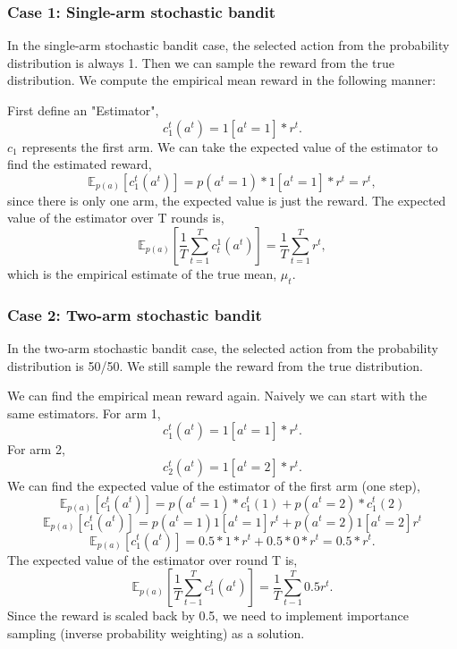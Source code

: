 \documentclass[11pt]{article}
\begin{document}
\subsubsection{Case 1: Single-arm stochastic bandit}
In the single-arm stochastic bandit case, the selected action from the probability distribution is always 1. Then we can sample the reward from the true distribution. We compute the empirical mean reward in the following manner:

First define an "Estimator",
$$ c_1^t(a^t) = 1[a^t = 1] * r^t. $$
$c_1$ represents the first arm. We can take the expected value of the estimator to find the estimated reward,
$$ \mathbb{E}_{p(a)} [c_1^t(a^t)] = p(a^t = 1) * 1[a^t = 1] * r^t = r^t, $$
since there is only one arm, the expected value is just the reward.
The expected value of the estimator over T rounds is,
$$ \mathbb{E}_{p(a)} [ \frac{1}{T} \sum_{t=1}^T c_t^1(a^t)] = \frac{1}{T} \sum_{t=1}^T r^t,$$
which is the empirical estimate of the true mean, $\mu_t$.

\subsubsection{Case 2: Two-arm stochastic bandit}
In the two-arm stochastic bandit case, the selected action from the probability distribution is 50/50. We still sample the reward from the true distribution.

We can find the empirical mean reward again. Naively we can start with the same estimators. For arm 1,
$$ c_1^t(a^t) = 1[a^t = 1] * r^t. $$
For arm 2, $$ c_2^t(a^t) = 1[a^t = 2] * r^t. $$
We can find the expected value of the estimator of the first arm (one step),
$$ \mathbb{E}_{p(a)}[c_1^t(a^t)] = p(a^t = 1) * c^t_1(1) + p(a^t = 2) * c_1^t (2)$$
$$ \mathbb{E}_{p(a)}[c_1^t(a^t)] = p(a^t = 1) 1[a^t = 1]r^t + p(a^t = 2) 1[a^t=2] r^t $$
$$ \mathbb{E}_{p(a)}[c_1^t(a^t)] = 0.5*1*r^t+0.5*0*r^t = 0.5*r^t.$$
The expected value of the estimator over round T is,
$$ \mathbb{E}_{p(a)}[\frac{1}{T} \sum_{t-1}^T c_1^t(a^t)] = \frac{1}{T} \sum_{t-1}^T 0.5r^t.$$
Since the reward is scaled back by 0.5, we need to implement importance sampling (inverse probability weighting) as a solution.
\end{document}
